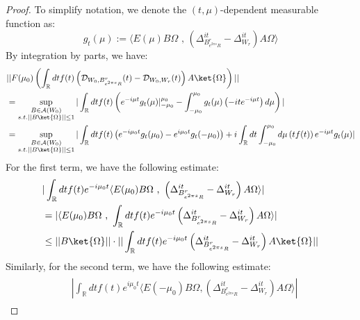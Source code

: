 \documentclass[a4paper,11pt]{article}
\theoremstyle{definition}
\theoremstyle{remark}
\newcommand{\lb}{\left(}
\newcommand{\rb}{\right)}
\begin{document}
\begin{proof}
    To simplify notation, we denote the $(t,\mu)$-dependent measurable function as:
    \begin{equation}
        g_t(\mu) := \langle E(\mu) B\Omega\text{ , }\lb\Delta^{it}_{B^r_{e^{2\pi s}R}} - \Delta^{it}_{W_r}\rb A\Omega\rangle
    \end{equation}
    By integration by parts, we have:
    \begin{align}
        \begin{split}
            &||F(\mu_0)\lb\int_\mathbb{R} dt f(t)\lb\mathcal{D}_{W_0, B^r_{e^{2\pi s}R}}(t) - \mathcal{D}_{W_0, W_r}(t)\rb A\ket{\Omega}\rb||
            \\&
            =\sup_{\substack{B\in\mathcal{A}(W_0)\\s.t.||B\ket{\Omega}||\leq 1}}|\int_\mathbb{R}dt f(t)\lb e^{-i\mu t}g_t(\mu)|_{-\mu_0}^{\mu_0} - \int_{-\mu_0}^{\mu_0}g_t(\mu)\lb-ite^{-i\mu t}\rb d\mu \rb|
            \\&
            =\sup_{\substack{B\in\mathcal{A}(W_0)\\s.t.||B\ket{\Omega}||\leq 1}}|\int_\mathbb{R} dt f(t) \lb e^{-i\mu_0 t}g_t(\mu_0)- e^{i\mu_0 t}g_t(-\mu_0)\rb + i\int_\mathbb{R} dt \int_{-\mu_0}^{\mu_0} d\mu \lb tf(t)\rb e^{-i\mu t} g_t(\mu)|
        \end{split}
    \end{align}
    For the first term, we have the following estimate:
    \begin{align}
        \begin{split}
            &|\int_\mathbb{R} dt f(t)e^{-i\mu_0 t}\langle E(\mu_0) B\Omega\text{ , }\lb\Delta^{it}_{B^r_{e^{2\pi s}R}} - \Delta^{it}_{W_r}\rb A\Omega\rangle|
            \\&
            =|\langle E(\mu_0)B\Omega\text{ , }\int_\mathbb{R}dt f(t)e^{-i\mu_0 t}\lb\Delta^{it}_{B^r_{e^{2\pi s}R}} - \Delta^{it}_{W_r}\rb A\Omega\rangle|
            \\&
            \leq ||B\ket{\Omega}||\cdot||\int_\mathbb{R} dt f(t) e^{-i\mu_0 t}\lb\Delta^{it}_{B^r_{e^{2\pi s}R}} - \Delta^{it}_{W_r}\rb A\ket{\Omega}||
        \end{split}
    \end{align}
    Similarly, for the second term, we have the following estimate:
    \begin{align}
        \begin{split}
            &|\int_\mathbb{R} dt f(t) e^{i\mu_0 t}\langle E(-\mu_0)B\Omega, \lb \Delta^{it}_{B^r_{e^{2\pi s}R}} - \Delta^{it}_{W_r} \rb A \Omega\rangle|

\end{split}
\end{align}
\end{proof}
\end{document}
